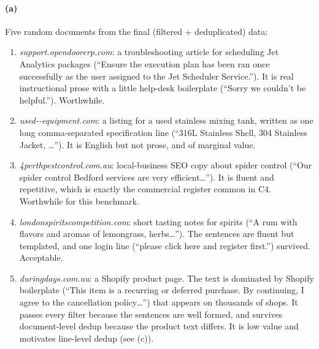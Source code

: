 \documentclass[11pt]{article}
\begin{document}
\paragraph{(a)} Five random documents from the final (filtered + deduplicated) data:
\begin{enumerate}
  \item \emph{support.opendoorerp.com}: a troubleshooting article for scheduling Jet Analytics packages (``Ensure the
  execution plan has been ran once successfully as the user assigned to the Jet Scheduler Service.'').
  It is real instructional prose with a little help-desk boilerplate (``Sorry we couldn't be helpful.''). Worthwhile.
  \item \emph{used{-}{-}equipment.com}: a listing for a used stainless mixing tank, written as one long comma-separated
  specification line (``316L Stainless Shell, 304 Stainless Jacket, \ldots''). It is English but not prose, and of marginal value.
  \item \emph{4perthpestcontrol.com.au}: local-business SEO copy about spider control (``Our spider control Bedford
  services are very efficient\ldots''). It is fluent and repetitive, which is exactly the commercial register common in C4.
  Worthwhile for this benchmark.
  \item \emph{londonspiritscompetition.com}: short tasting notes for spirits (``A rum with flavors and aromas of
  lemongrass, herbs\ldots''). The sentences are fluent but templated, and one login line (``please click here and register
  first.'') survived. Acceptable.
  \item \emph{duringdays.com.au}: a Shopify product page. The text is dominated by Shopify boilerplate (``This item is a
  recurring or deferred purchase. By continuing, I agree to the cancellation policy\ldots'') that appears on thousands of
  shops. It passes every filter because the sentences are well formed, and survives document-level dedup because the product
  text differs. It is low value and motivates line-level dedup (see (c)).
\end{enumerate}
\end{document}
